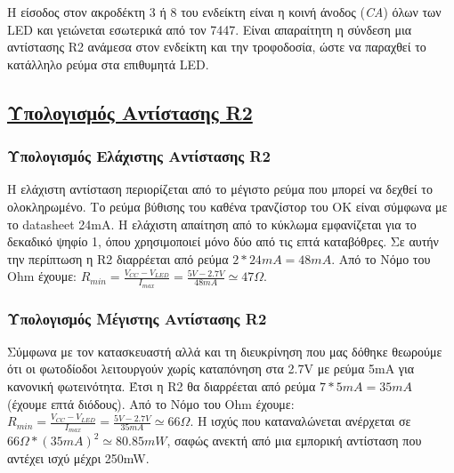 \documentclass[a4paper,10pt]{article} \usepackage{anysize}
\begin{document}
Η είσοδος στον ακροδέκτη 3 ή 8 του ενδείκτη είναι η κοινή άνοδος (\textit{CA})
όλων των LΕD και γειώνεται εσωτερικά από τον 7447. Είναι απαραίτητη η σύνδεση
μια αντίστασης R2 ανάμεσα στον ενδείκτη και την τροφοδοσία, ώστε να παραχθεί
το κατάλληλο ρεύμα στα επιθυμητά LED.

\subsection*{\textnormal{\underline{Υπολογισμός Αντίστασης R2}}}

\subsubsection*{\textnormal{Υπολογισμός Ελάχιστης Αντίστασης R2}} Η ελάχιστη
αντίσταση περιορίζεται από το μέγιστο ρεύμα που μπορεί να δεχθεί το
ολοκληρωμένο.  Το ρεύμα βύθισης του καθένα τρανζίστορ του ΟΚ είναι σύμφωνα με
το datasheet 24mA. Η ελάχιστη απαίτηση από το κύκλωμα εμφανίζεται για το
δεκαδικό ψηφίο 1, όπου χρησιμοποιεί μόνο δύο από τις επτά καταβόθρες. Σε αυτήν
την περίπτωση η R2 διαρρέεται από ρεύμα \begin{math} 2 \ast 24mA = 48mA
\end{math}. Από το Νόμο του Ohm έχουμε: \begin{math} R_{min}=\frac{V_{CC} -
V_{LED}}{I_{max}} = \frac{5V-2.7V}{48mA} \simeq47\Omega\end{math}.


\subsubsection*{\textnormal{Υπολογισμός Μέγιστης Αντίστασης R2}} Σύμφωνα με
τον κατασκευαστή αλλά και τη διευκρίνηση που μας δόθηκε θεωρούμε ότι οι
φωτοδίοδοι λειτουργούν χωρίς καταπόνηση στα 2.7V με ρεύμα 5mA για κανονική
φωτεινότητα. Έτσι η R2 θα διαρρέεται από ρεύμα \begin{math} 7 \ast 5mA = 35mA
\end{math} (έχουμε επτά διόδους). Από το Νόμο του Ohm έχουμε: \begin{math}
R_{min}=\frac{V_{CC} - V_{LED}}{I_{max}} = \frac{5V-2.7V}{35mA}
\simeq66\Omega\end{math}. Η ισχύς που καταναλώνεται ανέρχεται σε \begin{math}
66Ω \ast (35mA)^2 \simeq 80.85mW \end{math}, σαφώς ανεκτή από μια εμπορική
αντίσταση που αντέχει ισχύ μέχρι 250mW.
\end{document}
